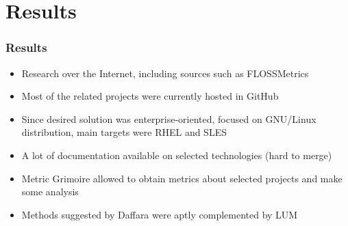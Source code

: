 \section{Results}

\begin{frame}
\frametitle{Results}

\begin{itemize}
  \item Research over the Internet, including sources such as FLOSSMetrics
  \item Most of the related projects were currently hosted in GitHub
  \item Since desired solution was enterprise-oriented, focused on GNU/Linux distribution, main targets were RHEL and SLES
  \item A lot of documentation available on selected technologies (hard to merge)
  \item Metric Grimoire allowed to obtain metrics about selected projects and make some analysis
  \item Methods suggested by Daffara were aptly complemented by LUM
\end{itemize}

\end{frame}